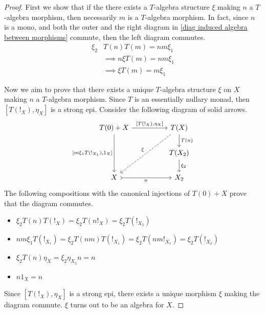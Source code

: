 \begin{subbox}{}
    \begin{proof}
First we show that if the there exists a $T$-algebra structure $\xi$ making $n$ a $T$-algebra morphism, then necessarily $m$ is a $T$-algebra morphism. In fact, since $n$ is a mono, and both the outer and the right diagram in \eqref{diag induced algebra between morphisms} commute, then the left diagram commutes.
\begin{align*}
    \xi_2 & T(n) T(m) = n m \xi_1 \\[1.5ex]
    & \implies n \xi T(m)= n m \xi_1 \\[1.5ex] 
    & \implies \xi T(m) = m \xi_1
\end{align*}


Now we aim to prove that there exists a unique $T$-algebra structure $\xi$ on $X$ making $n$ a $T$-algebra morphism. Since $T$ is an essentially nullary monad, then $[T(!_{X}),\eta_{X}]$ is a strong epi. Consider the following diagram of solid arrows. 
\[
\begin{tikzcd}
T(0)+X \arrow[rr, "{[T(!_{X}),\eta_{X}]}"] \arrow[dd, "{[m\xi_1T(!_{X_1}),1_X]}"'] &  & T(X) \arrow[d, "T(n)"] \arrow[lldd, "\xi"', dashed] \\
                                                                                   &  & T(X_2) \arrow[d, "\xi_2"]                           \\
X \arrow[rr, "n"', tail]                                                           &  & X_2                                                
\end{tikzcd}
\]
The following compositions with the canonical injections of $T(0)+X$ prove that the diagram commutes.
\begin{itemize}[itemsep=1.5ex]
    \item $\xi_2 T(n) T(!_X) = \xi_2 T(n!_X) = \xi_2 T(!_{X_2})$
    \item $nm\xi_1 T(!_{X_1}) = \xi_2 T(nm) T(!_{X_1}) = \xi_2 T(nm !_{X_1}) = \xi_2 T(!_{X_2})$
    \item $\xi_2T(n) \eta_X = \xi_2 \eta_{X_2} n = n$
    \item $n 1_X = n$
\end{itemize}
Since $[T(!_{X}),\eta_{X}]$ is a strong epi, there exists a unique morphism $\xi$ making the diagram commute. $\xi$ turns out to be an algebra for $X$. 


\end{proof}
\end{subbox}
